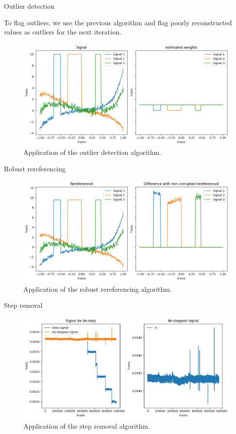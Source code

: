 \documentclass[10pt,serif]{beamer}
\begin{document}
\begin{frame}{Outlier detection}

    To flag outliers, we use the previous algorithm and flag poorly reconstructed values as outliers for the next iteration.

    \begin{figure}
        \centering
        \includegraphics[width=.8\textwidth]{figures/outlier_detection.png}
        \caption{Application of the outlier detection algorithm.}
        \label{fig:data}
    \end{figure}

\end{frame}

\begin{frame}{Robust rereferencing}

    \begin{figure}
        \centering
        \includegraphics[width=.8\textwidth]{figures/rereferencing.png}
        \caption{Application of the robust rereferencing algorithm.}
        \label{fig:data}
    \end{figure}

\end{frame}

\begin{frame}{Step removal}
    \begin{figure}
        \centering
        \includegraphics[width=.8\textwidth]{figures/step_removal_real.png}
        \caption{Application of the step removal algorithm.}
        \label{fig:data}
    \end{figure}
\end{frame}
\end{document}

